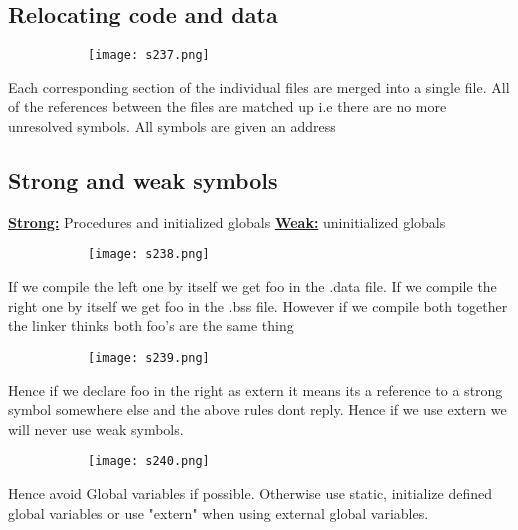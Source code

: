 \documentclass[8pt]{extreport}
\begin{document}
\subsection{Relocating code and data}
\begin{figure}[H]
\centering
\begin{subfigure}[b]{0.4\linewidth}
\texttt{[image: s237.png]}
\end{subfigure}
\end{figure}
Each corresponding section of the individual files are merged into a single file. All of the references between the files are matched up i.e there are no more unresolved symbols. All symbols are given an address 


\subsection{Strong and weak symbols}

\underline{\textbf{Strong:}} Procedures and initialized globals
\underline{\textbf{Weak:}} uninitialized globals
\begin{figure}[H]
\centering
\begin{subfigure}[b]{0.4\linewidth}
\texttt{[image: s238.png]}
\end{subfigure}
\end{figure}
If we compile the left one by itself we get foo in the .data file. If we compile the right one by itself we get foo in the .bss file. However if we compile both together the linker thinks both foo's are the same thing
\begin{figure}[H]
\centering
\begin{subfigure}[b]{0.4\linewidth}
\texttt{[image: s239.png]}
\end{subfigure}
\end{figure}
Hence if we declare foo in the right as extern it means its a reference to a strong symbol somewhere else and the above rules dont reply. Hence if we use extern we will never use weak symbols.
\begin{figure}[H]
\centering
\begin{subfigure}[b]{0.4\linewidth}
\texttt{[image: s240.png]}
\end{subfigure}
\end{figure}
Hence avoid Global variables if possible. Otherwise use static, initialize defined global variables or use "extern" when using external global variables.
\end{document}
